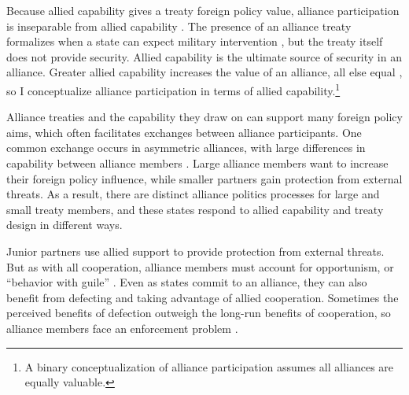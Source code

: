 \documentclass[12pt]{article}
\begin{document}
Because allied capability gives a treaty foreign policy value, alliance participation is inseparable from allied capability \citep{FordhamPoast2014}. 
The presence of an alliance treaty formalizes when a state can expect military intervention \citep{Morrow2000}, but the treaty itself does not provide security. 
Allied capability is the ultimate source of security in an alliance. 
Greater allied capability increases the value of an alliance, all else equal \citep{Johnsonetal2015}, so I conceptualize alliance participation in terms of allied capability.\footnote{A binary conceptualization of alliance participation assumes all alliances are equally valuable.}


Alliance treaties and the capability they draw on can support many foreign policy aims, which often facilitates exchanges between alliance participants. 
One common exchange occurs in asymmetric alliances, with large differences in capability between alliance members \citep{Morrow1991}. 
Large alliance members want to increase their foreign policy influence, while smaller partners gain protection from external threats. 
As a result, there are distinct alliance politics processes for large and small treaty members, and these states respond to allied capability and treaty design in different ways. 


Junior partners use allied support to provide protection from external threats. 
But as with all cooperation, alliance members must account for opportunism, or ``behavior with guile'' \citep{Williamson1985}. 
Even as states commit to an alliance, they can also benefit from defecting and taking advantage of allied cooperation. 
Sometimes the perceived benefits of defection outweigh the long-run benefits of cooperation, so alliance members face an enforcement problem \citep{Fearon1998a, Koremenosetal2001}.
\end{document}
